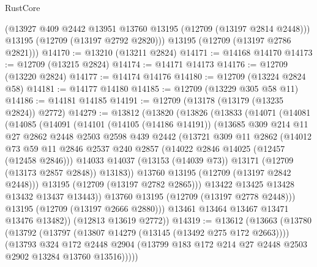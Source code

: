 \begin{lexlean}{RustCore}
\begin{coremodule}
        (@13927 @409 @2442 @13951 @13760 @13195 (@12709 (@13197 @2814 @2448)))
        @13195
        (@12709 (@13197 @2792 @2820)))
      @13195
      (@12709 (@13197 @2786 @2821)))
@14170 := @13210 (@13211 @2824)
@14171 := @14168 @14170
@14173 := @12709 (@13215 @2824)
@14174 := @14171 @14173
@14176 := @12709 (@13220 @2824)
@14177 := @14174 @14176
@14180 := @12709 (@13224 @2824 @58)
@14181 := @14177 @14180
@14185 := @12709 (@13229 @305 @58 @11)
@14186 := @14181 @14185
@14191 := @12709 (@13178 (@13179 (@13235 @2824)) @2772)
@14279 := @13812
    (@13820
      (@13826
        (@13833
          (@14071
            (@14081
              (@14085
                (@14091
                  (@14101
                    (@14105 (@14186 @14191))
                    (@13685
                      @309
                      @214
                      @11
                      @27
                      @2862
                      @2448
                      @2503
                      @2598
                      @439
                      @2442
                      (@13721
                        @309
                        @11
                        @2862
                        (@14012
                          @73
                          @59
                          @11
                          @2846
                          @2537
                          @240
                          @2857
                          (@14022 @2846 @14025 (@12457 (@12458 @2846)))
                          @14033
                          @14037
                          (@13153 (@14039 @73))
                          @13171
                          (@12709 (@13173 @2857 @2848))
                          @13183))
                      @13760
                      @13195
                      (@12709 (@13197 @2842 @2448)))
                    @13195
                    (@12709 (@13197 @2782 @2865)))
                  @13422
                  @13425
                  @13428
                  @13432
                  @13437
                  @13443))
              @13760
              @13195
              (@12709 (@13197 @2778 @2448)))
            @13195
            (@12709 (@13197 @2666 @2880)))
          @13461
          @13464
          @13467
          @13471
          @13476
          @13482))
      (@12813 @13619 @2772))
@14319 := @13612
    (@13663
      (@13780
        (@13792
          (@13797 (@13807 @14279 (@13145 (@13492 @275 @172 @2663))))
          (@13793
            @324
            @172
            @2448
            @2904
            (@13799 @183 @172 @214 @27 @2448 @2503 @2902 @13284 @13760 @13516)))))

\end{coremodule}
\end{lexlean}
